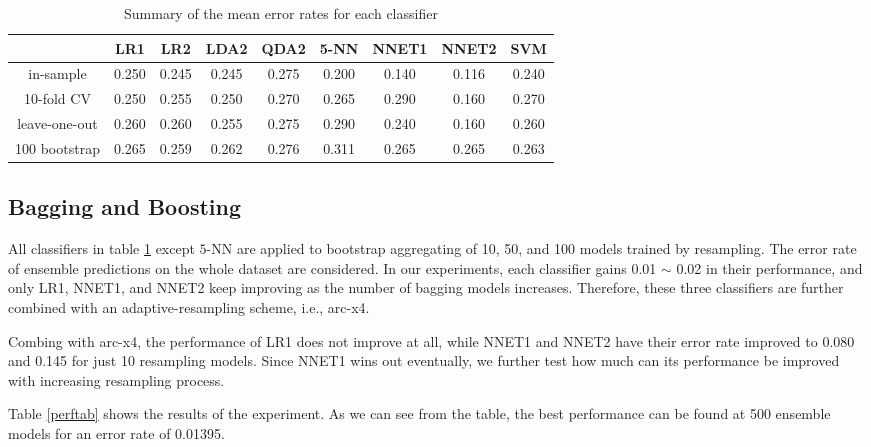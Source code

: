 \documentclass[a4paper,12pt]{article}
\begin{document}
\begin{table}
\begin{center}
\caption[summary comparison]{Summary of the mean error rates for each classifier}
\label{compall}
\begin{tabular}{ccccccccc}
\hline
              & LR1   & LR2   & LDA2  & QDA2  & 5-NN  & NNET1 & NNET2 & SVM \\
\hline
in-sample     & 0.250 & 0.245 & 0.245 & 0.275 & 0.200 & 0.140 & 0.116 & 0.240 \\
10-fold CV    & 0.250 & 0.255 & 0.250 & 0.270 & 0.265 & 0.290 & 0.160 & 0.270 \\
leave-one-out & 0.260 & 0.260 & 0.255 & 0.275 & 0.290 & 0.240 & 0.160 & 0.260 \\
100 bootstrap & 0.265 & 0.259 & 0.262 & 0.276 & 0.311 & 0.265 & 0.265 & 0.263 \\
\hline
\end{tabular}
\end{center}
\end{table}


\subsection*{\bf Bagging and Boosting}
All classifiers in table \ref{compall} except $5$-NN are applied to bootstrap aggregating of 10, 50, and 100 models trained by resampling.  The error rate of ensemble predictions on the whole dataset are considered.  In our experiments, each classifier gains 0.01 $\sim$ 0.02 in their performance, and only LR1, NNET1, and NNET2 keep improving as the number of bagging models increases.  Therefore, these three classifiers are further combined with an adaptive-resampling scheme, i.e., arc-x4.

Combing with arc-x4, the performance of LR1 does not improve at all, while NNET1 and NNET2 have their error rate improved to 0.080 and 0.145 for just 10 resampling models.  Since NNET1 wins out eventually, we further test how much can its performance be improved with increasing resampling process.

Table \ref{perftab} shows the results of the experiment.  As we can see from the table, the best performance can be found at 500 ensemble models for an error rate of 0.01395.  

\end{document}
